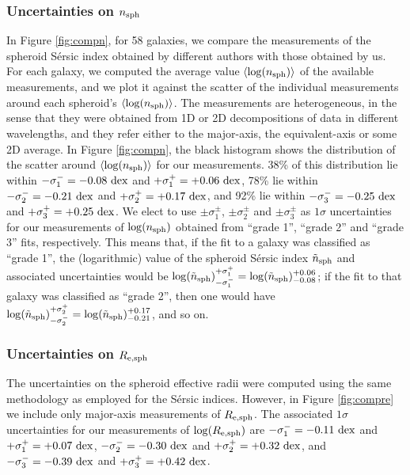 \documentclass[preprint2]{emulateapj}
\begin{document}
\subsubsection{Uncertainties on $n_{\rm sph}$}
In Figure \ref{fig:compn}, for 58 galaxies, 
we compare the measurements of the spheroid S\'ersic index obtained by different authors 
with those obtained by us. 
For each galaxy, we computed the average value $\langle \log(n_{\rm sph}) \rangle$ of the available measurements, 
and we plot it against the scatter of the individual measurements around each spheroid's $\langle \log(n_{\rm sph}) \rangle$.
The measurements are heterogeneous, 
in the sense that they were obtained from 1D or 2D decompositions of data in different wavelengths, 
and they refer either to the major-axis, the equivalent-axis or some 2D average.
In Figure \ref{fig:compn}, the black histogram shows the distribution of the scatter around $\langle \log(n_{\rm sph}) \rangle$ 
for our measurements. 
38\% of this distribution lie within $-\sigma_1^- = -0.08~\rm dex$ and $+\sigma_1^+ = +0.06~\rm dex$, 
78\% lie within $-\sigma_2^- = -0.21~\rm dex$ and $+\sigma_2^+ = +0.17~\rm dex$,
and 92\% lie within $-\sigma_3^- = -0.25~\rm dex$ and $+\sigma_3^+ = +0.25~\rm dex$. 
We elect to use $\pm \sigma_1^\pm$, $\pm \sigma_2^\pm$ and $\pm \sigma_3^\pm$ as $1\sigma$ uncertainties 
for our measurements of $\log(n_{\rm sph})$ obtained from ``grade 1'', ``grade 2'' and ``grade 3'' fits, respectively. 
This means that, if the fit to a galaxy was classified as ``grade 1'', 
the (logarithmic) value of the spheroid S\'ersic index $\tilde{n}_{\rm sph}$ and associated uncertainties would be 
$\log(\tilde{n}_{\rm sph})^{+\sigma_1^+}_{-\sigma_1^-} = \log(\tilde{n}_{\rm sph})^{+0.06}_{-0.08}$; 
if the fit to that galaxy was classified as ``grade 2'', 
then one would have $\log(\tilde{n}_{\rm sph})^{+\sigma_2^+}_{-\sigma_2^-} = \log(\tilde{n}_{\rm sph})^{+0.17}_{-0.21}$, 
and so on.   

\subsubsection{Uncertainties on $R_{\rm e,sph}$}
The uncertainties on the spheroid effective radii were computed using the same methodology as employed for the S\'ersic indices. 
However, in Figure \ref{fig:compre} we include only major-axis measurements of $R_{\rm e,sph}$. 
The associated $1\sigma$ uncertainties for our measurements of $\log(R_{\rm e,sph})$ are 
$-\sigma_1^- = -0.11~\rm dex$ and $+\sigma_1^+ = +0.07~\rm dex$, 
$-\sigma_2^- = -0.30~\rm dex$ and $+\sigma_2^+ = +0.32~\rm dex$,
and $-\sigma_3^- = -0.39~\rm dex$ and $+\sigma_3^+ = +0.42~\rm dex$. 
\end{document}

